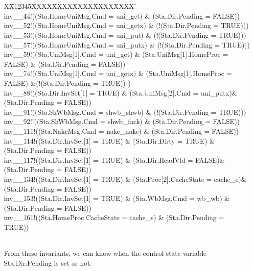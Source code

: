 \documentclass{llncs}
\newlength{\fminilength}
\newenvironment{fmini}[1][\linewidth]
  {\setlength{\fminilength}{#1\fboxsep-2\fboxrule}%
   \vspace{2ex}\noindent\begin{lrbox}{\fminibox}\begin{minipage}{\fminilength}%
   \mbox{ }\hfill\vspace{-2.5ex}}%
  {\end{minipage}\end{lrbox}\vspace{1ex}\hspace{0ex}%
   \framebox{\usebox{\fminibox}}}
\newenvironment{specification}
{\noindent\scriptsize
\tt\begin{fmini}\begin{tabbing}X\=X12345\=XXXX\=XXXX\=XXXX\=XXXX\=XXXX
\=\+\kill} {\end{tabbing}\normalfont\end{fmini}}
\begin{document}
\begin{specification}\\
inv\_\_44!((Sta.HomeUniMsg.Cmd = uni\_get) \& (Sta.Dir.Pending = FALSE))\\
inv\_\_52!((Sta.HomeUniMsg.Cmd = uni\_getx) \& (!(Sta.Dir.Pending = TRUE)))\\
inv\_\_53!((Sta.HomeUniMsg.Cmd = uni\_put) \& (!(Sta.Dir.Pending = TRUE)))\\
inv\_\_57!((Sta.HomeUniMsg.Cmd = uni\_putx) \& (!(Sta.Dir.Pending = TRUE)))\\
inv\_\_59!((Sta.UniMsg[1].Cmd = uni\_get) \& (Sta.UniMsg[1].HomeProc = FALSE) \& (Sta.Dir.Pending = FALSE))\\
inv\_\_74!((Sta.UniMsg[1].Cmd = uni\_getx) \& (Sta.UniMsg[1].HomeProc = FALSE) \&(!(Sta.Dir.Pending = TRUE)) )\\
inv\_\_88!((Sta.Dir.InvSet[1] = TRUE)  \& (Sta.UniMsg[2].Cmd = uni\_putx)\& (Sta.Dir.Pending = FALSE))\\
inv\_\_91!((Sta.ShWbMsg.Cmd = shwb\_shwb) \& (!(Sta.Dir.Pending = TRUE)))\\
inv\_\_92!!((Sta.ShWbMsg.Cmd = shwb\_fack) \& (Sta.Dir.Pending = FALSE))\\
inv\_\_111!((Sta.NakcMsg.Cmd = nakc\_nakc) \& (Sta.Dir.Pending = FALSE))\\
inv\_\_114!((Sta.Dir.InvSet[1] = TRUE) \& (Sta.Dir.Dirty = TRUE) \& (Sta.Dir.Pending = FALSE))\\
inv\_\_117!((Sta.Dir.InvSet[1] = TRUE)  \& (Sta.Dir.HeadVld = FALSE)\& (Sta.Dir.Pending = FALSE))\\
inv\_\_134!((Sta.Dir.InvSet[1] = TRUE)  \& (Sta.Proc[2].CacheState = cache\_e)\& (Sta.Dir.Pending = FALSE))\\
inv\_\_153!((Sta.Dir.InvSet[1] = TRUE) \& (Sta.WbMsg.Cmd = wb\_wb) \& (Sta.Dir.Pending = FALSE))\\
inv\_\_161!((Sta.HomeProc.CacheState = cache\_s) \& (Sta.Dir.Pending = TRUE))\\
\end{specification}\\
From these invariants, we can know when the control state variable Sta.Dir.Pending is set or not.
\end{document}
